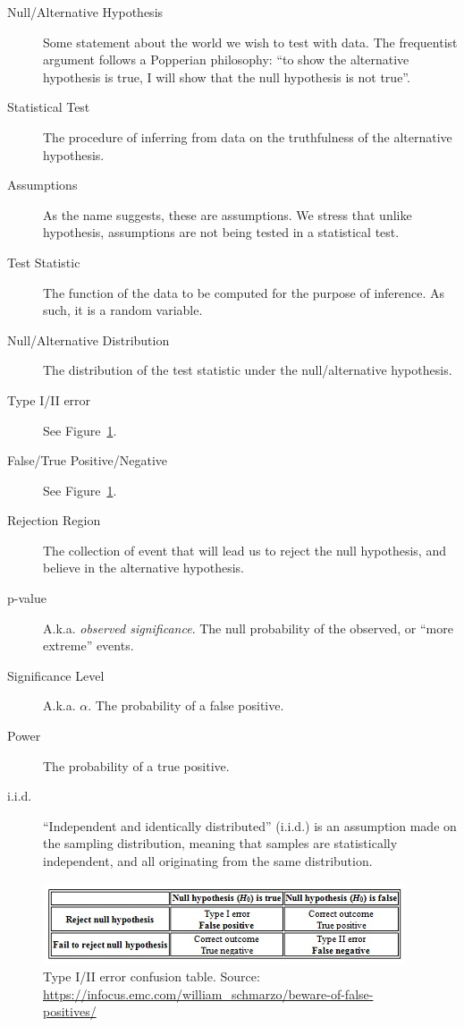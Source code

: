 \documentclass[12pt,a4paper]{report}
\begin{document}
\begin{description}
\item [Null/Alternative Hypothesis] Some statement about the world we wish to test with data. The frequentist argument follows a Popperian philosophy: ``to show the alternative hypothesis is true, I will show that the null hypothesis is not true''. 
\item [Statistical Test] The procedure of inferring from data on the truthfulness of the alternative hypothesis.
\item [Assumptions] As the name suggests, these are assumptions. We stress that unlike hypothesis, assumptions are not being tested in a statistical test. 
\item [Test Statistic] The function of the data to be computed for the purpose of inference. As such, it is a random variable. 
\item [Null/Alternative Distribution] The distribution of the test statistic under the null/alternative hypothesis.
\item [Type I/II error] See Figure~\ref{fig:confusion_table}.
\item [False/True Positive/Negative] See Figure~\ref{fig:confusion_table}.
\item [Rejection Region] The collection of event that will lead us to reject the null hypothesis, and believe in the alternative hypothesis.
\item [p-value] A.k.a. \emph{observed significance}. The null probability of the observed, or ``more extreme'' events.
\item [Significance Level] A.k.a. $\alpha$. The probability of a false positive.
\item [Power] The probability of a true positive.
\item [i.i.d.] ``Independent and identically distributed'' (i.i.d.) is an assumption made on the sampling distribution, meaning that samples are statistically independent, and all originating from the same distribution.

\end{description}

\begin{figure}
\centering
\includegraphics[width=0.8\linewidth]{art/Beware-of-False-Positives-Chart-1}
\caption[Confusion Table]{Type I/II error confusion table. Source: \url{https://infocus.emc.com/william_schmarzo/beware-of-false-positives/}}
\label{fig:confusion_table}
\end{figure}
\end{document}
